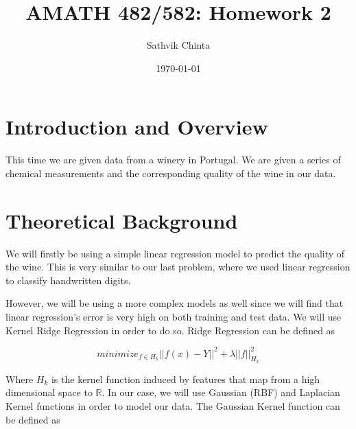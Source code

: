 \documentclass[11pt]{amsart}
\title{AMATH 482/582: Homework 2}
\author{Sathvik Chinta} %
\date{\today} %
\begin{document}
\maketitle 

\begin{abstract}
     
\end{abstract}


\section{Introduction and Overview}\label{sec:Introduction}
This time we are given data from a winery in Portugal. We are given a series of chemical measurements and the corresponding quality of the wine 
in our data. 


\section{Theoretical Background}\label{sec:theory}
We will firstly be using a simple linear regression model to predict the quality of the wine. This is very similar 
to our last problem, where we used linear regression to classify handwritten digits.

However, we will be using a more complex models as well since we will find that linear regression's error is very high on 
both training and test data. We will use Kernel Ridge Regression in order to do so. Ridge Regression can be defined 
as 

\[minimize_{f \in H_k} ||f(x) - Y||^2 + \lambda||f||^2_{H_k}\]

Where $H_k$ is the kernel function induced by features that map from a high
dimensional space to $\mathbb{R}$. In our case, we will use Gaussian (RBF) and Laplacian Kernel functions 
in order to model our data. The Gaussian Kernel function can be defined as 
\end{document}
